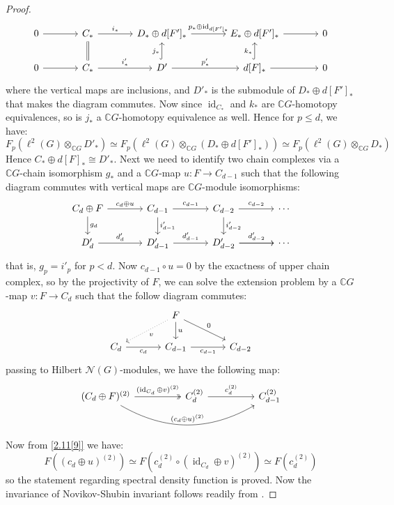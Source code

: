 \documentclass[11pt]{report}
\theoremstyle{definition}
\theoremstyle{plain}
\DeclareMathOperator{\id}{id}
\newcommand{\complex}{\mathbb{C}}
\newcommand{\vna}{\mathcal{N}}
\begin{document}
\begin{proof}
	\begin{equation}
	\begin{tikzcd}[column sep=large]
	0 \rar &C_* \rar{i_*} &D_*\oplus d[F']_*\rar{p_*\oplus \id_{d[F']_*}} & E_*\oplus d[F']_*\rar &0\\
	0 \rar &C_*\rar{i_*'} \uar[equal] &D'\uar[hook]{j_*} \rar{p_*'} &d[F]_* \rar \uar[hook]{k_*} &0
	\end{tikzcd}
	\end{equation}
	where the vertical maps are inclusions, and $D'_*$ is the submodule of $D_*\oplus d[F']_*$ that makes the diagram commutes. Now since $\id_{C_*}$ and $k_*$ are $\complex G$-homotopy equivalences, so is $j_*$ a $\complex G$-homotopy equivalence as well. Hence for $p\leq d$, we have:
	\begin{equation*}
	F_p(\ell^2(G)\otimes_{\complex G}D'_*)\simeq F_p(\ell^2(G)\otimes_{\complex G}(D_*\oplus d[F']_*))\simeq F_p(\ell^2(G)\otimes_{\complex G}D_*)
	\end{equation*}
	Hence $ C_*\oplus d[F]_* \cong D'_*$. Next we need to identify two chain complexes via a $\complex G$-chain isomorphism $g_*$ and a $\complex G$-map $u:F\to C_{d-1}$ such that the following diagram commutes with vertical maps are $\complex G$-module isomorphisms:
	\begin{equation}
	\begin{tikzcd}[column sep= large]
		C_{d}\oplus F\dar{g_d} \rar{c_d\oplus u} &C_{d-1} \dar{i'_{d-1}} \rar{c_{d-1}} &C_{d-2} \dar{i'_{d-2}} \rar{c_{d-2}} &\cdots\\
		D'_{d}\rar{d'_d} &D'_{d-1}\rar{d'_{d-1}} &D'_{d-2} \rar{d'_{d-2}}\rar &\cdots		
	\end{tikzcd}
	\end{equation}
that is, $g_p=i'_p$ for $p<d$. Now $c_{d-1}\circ u=0$ by the exactness of upper chain complex, so by the projectivity of $F$, we can solve the extension problem by a $\complex G$-map $v:F\to C_{d}$ such that the follow diagram commutes:
\begin{equation}
\begin{tikzcd}[column sep= large]
&F\ar[dl, dotted, "v"]\dar{u}\ar{dr}{0}\\ C_d \rar[swap]{c_d} &C_{d-1} \rar[swap]{c_{d-1}} &C_{d-2}
\end{tikzcd}
\end{equation}
passing to Hilbert $\vna(G)$-modules, we have the following map:
\begin{equation}
\begin{tikzcd}[column sep=huge]
(C_d\oplus F)^{(2)}\ar[rr, bend right, "(c_d\oplus u)^{(2)}"] \rar[two heads]{(\id_{C_d}\oplus v)^{(2)}} &C_d^{(2)} \rar{c_d^{(2)}} &C_{d-1}^{(2)}
\end{tikzcd}
\end{equation}
Now from \ref{2.11[9]} we have:
\begin{equation*}
F((c_d\oplus u)^{(2)})\simeq F(c_{d}^{(2)}\circ(\id_{C_d}\oplus v)^{(2)}) \simeq F(c_d^{(2)})
\end{equation*}
so the statement regarding spectral density function is proved. Now the invariance of Novikov-Shubin invariant follows readily from .
\end{proof}
\end{document}
